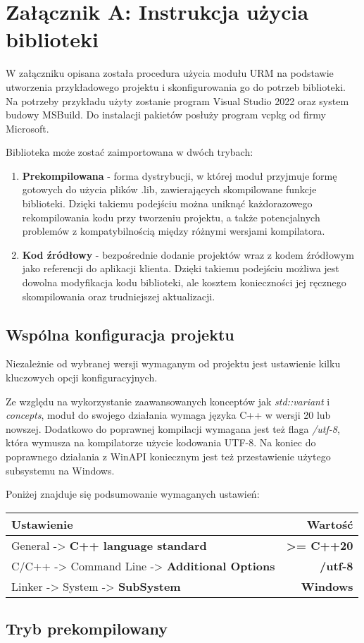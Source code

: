 \chapter*{Załącznik A: Instrukcja użycia biblioteki}
W załączniku opisana została procedura użycia modułu URM na podstawie utworzenia przykładowego projektu i skonfigurowania go do potrzeb biblioteki. Na potrzeby przykładu użyty zostanie program Visual Studio 2022 oraz system budowy MSBuild. Do instalacji pakietów posłuży program vcpkg od firmy Microsoft. 

Biblioteka może zostać zaimportowana w dwóch trybach:
\begin{enumerate}
	\item \textbf{Prekompilowana} - forma dystrybucji, w której moduł przyjmuje formę gotowych do użycia plików .lib, zawierających skompilowane funkcje biblioteki. Dzięki takiemu podejściu można uniknąć każdorazowego rekompilowania kodu przy tworzeniu projektu, a także potencjalnych problemów z kompatybilnością między różnymi wersjami kompilatora. 
	\item \textbf{Kod źródłowy} - bezpośrednie dodanie projektów wraz z kodem źródłowym jako referencji do aplikacji klienta. Dzięki takiemu podejściu możliwa jest dowolna modyfikacja kodu biblioteki, ale kosztem konieczności jej ręcznego skompilowania oraz trudniejszej aktualizacji.
\end{enumerate}

\section*{Wspólna konfiguracja projektu}
Niezależnie od wybranej wersji wymaganym od projektu jest ustawienie kilku kluczowych opcji konfiguracyjnych. 

Ze względu na wykorzystanie zaawansowanych konceptów jak \textit{std::variant} i \textit{concepts}, moduł do swojego działania wymaga języka C++ w wersji 20 lub nowszej. Dodatkowo do poprawnej kompilacji wymagana jest też flaga \textit{/utf-8}, która wymusza na kompilatorze użycie kodowania UTF-8. Na koniec do poprawnego działania z WinAPI koniecznym jest też przestawienie użytego subsystemu na Windows.

Poniżej znajduje się podsumowanie wymaganych ustawień:
\begin{center}
	\begin{tabular}{ |l r|}
		\hline
		\textbf{Ustawienie} & \textbf{Wartość} \\
		\hline
		General -> \textbf{C++ language standard}  & \textbf{>= C++20} \\
		C/C++ -> Command Line -> \textbf{Additional Options} & \textbf{/utf-8} \\
		Linker -> System -> \textbf{SubSystem} & \textbf{Windows} \\
		\hline
	\end{tabular}
\end{center}

\section*{Tryb prekompilowany}
